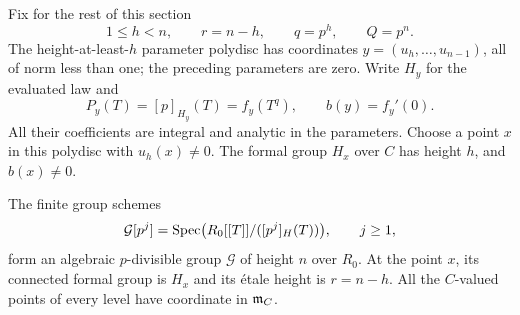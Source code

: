 Fix for the rest of this section
\[
 1\le h<n,\qquad r=n-h,\qquad q=p^h,\qquad Q=p^n.
\]
The height-at-least-$h$ parameter polydisc has coordinates
$y=(u_h,\ldots,u_{n-1})$, all of norm less than one; the preceding parameters
are zero.  Write $H_y$ for the evaluated law and
\[
 P_y(T)=[p]_{H_y}(T)=f_y(T^q),\qquad b(y)=f_y'(0).
\]
All their coefficients are integral and analytic in the parameters.
Choose a point $x$ in this polydisc with $u_h(x)\ne0$.  The formal group
$H_x$ over $C$ has height $h$, and $b(x)\ne0$.

\begin{lemma}\label{def:algebraization}
The finite group schemes
\[
 \mathcal G[p^j]
   =\operatorname{Spec}\bigl(R_0[[T]]/([p^j]_H(T))\bigr),\qquad j\ge1,
\]
form an algebraic $p$-divisible group $\mathcal G$ of height $n$ over $R_0$.
At the point $x$, its connected formal group is $H_x$ and its \'etale
height is $r=n-h$.  All the $C$-valued points of every level have coordinate
in $\mathfrak m_C$.
\end{lemma}

